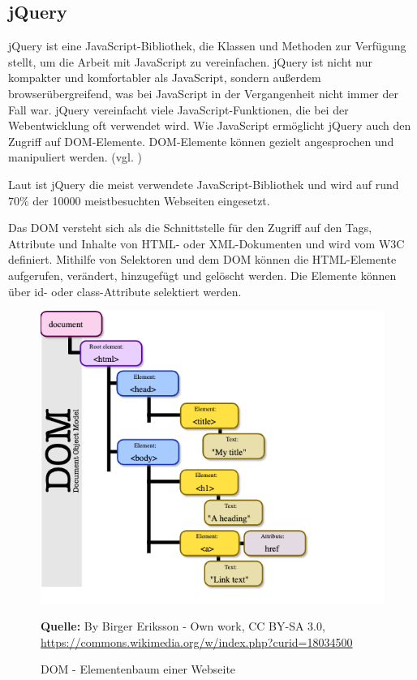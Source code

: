 \subsection{jQuery}
\label{sec:jQuery}
jQuery ist eine JavaScript-Bibliothek, die Klassen und Methoden zur Verfügung stellt, um die Arbeit mit JavaScript zu vereinfachen. jQuery ist nicht nur kompakter und komfortabler als JavaScript, sondern außerdem browserübergreifend, was bei JavaScript in der Vergangenheit nicht immer der Fall war. jQuery vereinfacht viele JavaScript-Funktionen, die bei der Webentwicklung oft verwendet wird. Wie JavaScript ermöglicht jQuery auch den Zugriff auf DOM-Elemente. DOM-Elemente können gezielt angesprochen und manipuliert werden. (vgl. \cite{Ste2019})\bigskip

Laut \cite{Wiki2019b} ist jQuery die meist verwendete JavaScript-Bibliothek und wird auf rund 70\% der 10000 meistbesuchten Webseiten eingesetzt.\bigskip

Das DOM versteht sich als die Schnittstelle für den Zugriff auf den Tags, Attribute und Inhalte von HTML- oder XML-Dokumenten und wird vom W3C definiert. Mithilfe von Selektoren und dem DOM können die HTML-Elemente aufgerufen, verändert, hinzugefügt und gelöscht werden. Die Elemente können über id- oder class-Attribute selektiert werden. 

\begin{figure}[H]
  \begin{center}
    \includegraphics[scale=0.5]{img/dom}
	\caption{DOM - Elementenbaum einer Webseite}
	\footnotesize\sffamily\textbf{Quelle:} By Birger Eriksson - Own work, CC BY-SA 3.0, \url{https://commons.wikimedia.org/w/index.php?curid=18034500} 
	\label{fig:dom}
  \end{center}   
\end{figure}

